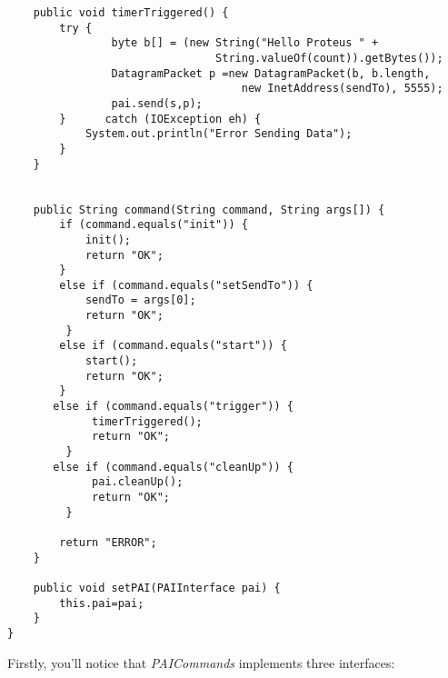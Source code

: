 \begin{verbatim}
    public void timerTriggered() {
        try {
                byte b[] = (new String("Hello Proteus " + 
                				String.valueOf(count)).getBytes());
                DatagramPacket p =new DatagramPacket(b, b.length, 
                					new InetAddress(sendTo), 5555);
                pai.send(s,p);
        }      catch (IOException eh) {
            System.out.println("Error Sending Data");
        }
    }


    public String command(String command, String args[]) {
        if (command.equals("init")) {
            init();
            return "OK";
        }
        else if (command.equals("setSendTo")) {
            sendTo = args[0];
            return "OK";
         }
        else if (command.equals("start")) {
            start();
            return "OK";
        }
       else if (command.equals("trigger")) {
             timerTriggered();
             return "OK";
         }
       else if (command.equals("cleanUp")) {
             pai.cleanUp();
             return "OK";
         }

        return "ERROR";
    }

    public void setPAI(PAIInterface pai) {
        this.pai=pai;
    }
}
\end{verbatim}
\normalsize

Firstly, you'll notice that \emph{PAICommands} implements three interfaces:

